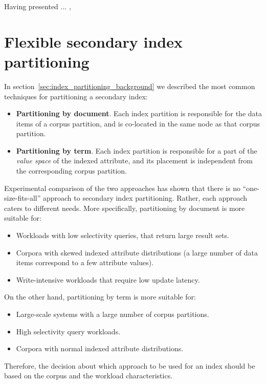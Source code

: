 Having presented ... ,

\section{Flexible secondary index partitioning}
In section~\ref{sec:index_partitioning_background} we described the most common techniques for partitioning a secondary index:
\begin{itemize}
  \item \textbf{Partitioning by document}.
  Each index partition is responsible for the data items of a corpus partition,
  and is co-located in the same node as that corpus partition.
  \item \textbf{Partitioning by term}.
  Each index partition is responsible for a part of the \textit{value space} of the indexed attribute,
  and its placement is independent from the corresponding corpus partition.
\end{itemize}

Experimental comparison of the two approaches has shown \cite{dsilva:tworings, kejriwal:slik} that there is no ``one-size-fits-all'' approach to secondary
index partitioning.
Rather, each approach caters to different needs.
More specifically, partitioning by document is more suitable for:
\begin{itemize}
  \item Workloads with low selectivity queries, that return large result sets.
  \item Corpora with skewed indexed attribute distributions (a large number of data items correspond to a few attribute values).
  \item Write-intensive workloads that require low update latency.
\end{itemize}
\noindent
On the other hand, partitioning by term is more suitable for:
\begin{itemize}
  \item Large-scale systems with a large number of corpus partitions.
  \item High selectivity query workloads.
  \item Corpora with normal indexed attribute distributions.
\end{itemize}

Therefore, the decision about which approach to be used for an index should be based on the corpus and the workload characteristics.

